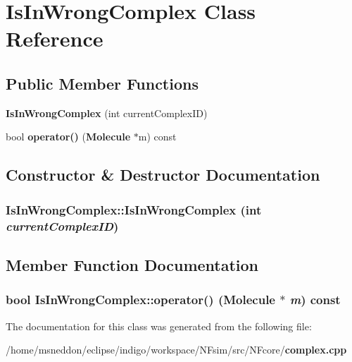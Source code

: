\section{IsInWrongComplex Class Reference}
\label{classIsInWrongComplex}
\subsection*{Public Member Functions}
\begin{CompactItemize}
\item 
{\bf IsInWrongComplex} (int currentComplexID)
\item 
bool {\bf operator()} ({\bf Molecule} $\ast$m) const 
\end{CompactItemize}


\subsection{Constructor \& Destructor Documentation}
\subsubsection{\setlength{\rightskip}{0pt plus 5cm}IsInWrongComplex::IsInWrongComplex (int {\em currentComplexID})\hspace{0.3cm}{\tt  [inline]}}\label{classIsInWrongComplex_8ffb7d3c8b148441f1ec3b4bd23362af}




\subsection{Member Function Documentation}
\subsubsection{\setlength{\rightskip}{0pt plus 5cm}bool IsInWrongComplex::operator() ({\bf Molecule} $\ast$ {\em m}) const\hspace{0.3cm}{\tt  [inline]}}\label{classIsInWrongComplex_38f0096d82bcfc84bb3b1290fcd6241a}




The documentation for this class was generated from the following file:\begin{CompactItemize}
\item 
/home/msneddon/eclipse/indigo/workspace/NFsim/src/NFcore/{\bf complex.cpp}\end{CompactItemize}
